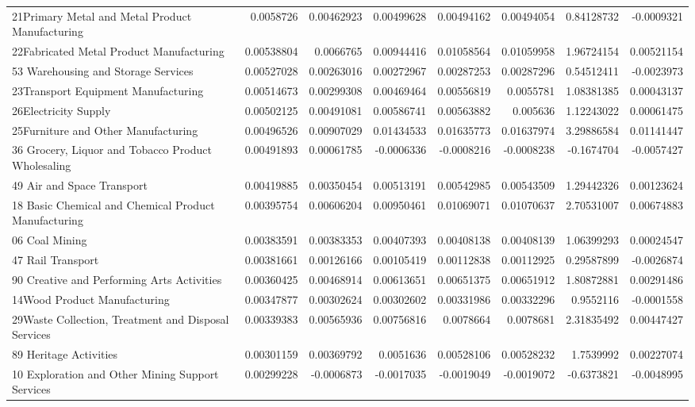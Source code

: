 \documentclass{monashthesis}
\begin{document}
\begin{table}[ht]
{\begin{tabular}{|l|r|rrrr|rr|}
    21Primary Metal and Metal Product Manufacturing & 0.0058726 & 0.00462923 & 0.00499628 & 0.00494162 & 0.00494054 & 0.84128732 & -0.0009321 \\
    22Fabricated Metal Product Manufacturing & 0.00538804 & 0.0066765 & 0.00944416 & 0.01058564 & 0.01059958 & 1.96724154 & 0.00521154 \\
    53 Warehousing and Storage Services & 0.00527028 & 0.00263016 & 0.00272967 & 0.00287253 & 0.00287296 & 0.54512411 & -0.0023973 \\
    23Transport Equipment Manufacturing & 0.00514673 & 0.00299308 & 0.00469464 & 0.00556819 & 0.0055781 & 1.08381385 & 0.00043137 \\
    26Electricity Supply & 0.00502125 & 0.00491081 & 0.00586741 & 0.00563882 & 0.005636 & 1.12243022 & 0.00061475 \\
    25Furniture and Other Manufacturing & 0.00496526 & 0.00907029 & 0.01434533 & 0.01635773 & 0.01637974 & 3.29886584 & 0.01141447 \\
    36 Grocery, Liquor and Tobacco Product Wholesaling & 0.00491893 & 0.00061785 & -0.0006336 & -0.0008216 & -0.0008238 & -0.1674704 & -0.0057427 \\
    49 Air and Space Transport & 0.00419885 & 0.00350454 & 0.00513191 & 0.00542985 & 0.00543509 & 1.29442326 & 0.00123624 \\
    18 Basic Chemical and Chemical Product Manufacturing & 0.00395754 & 0.00606204 & 0.00950461 & 0.01069071 & 0.01070637 & 2.70531007 & 0.00674883 \\
    06 Coal Mining & 0.00383591 & 0.00383353 & 0.00407393 & 0.00408138 & 0.00408139 & 1.06399293 & 0.00024547 \\
    47 Rail Transport & 0.00381661 & 0.00126166 & 0.00105419 & 0.00112838 & 0.00112925 & 0.29587899 & -0.0026874 \\
    90 Creative and Performing Arts Activities & 0.00360425 & 0.00468914 & 0.00613651 & 0.00651375 & 0.00651912 & 1.80872881 & 0.00291486 \\
    14Wood Product Manufacturing & 0.00347877 & 0.00302624 & 0.00302602 & 0.00331986 & 0.00332296 & 0.9552116 & -0.0001558 \\
    29Waste Collection, Treatment and Disposal Services & 0.00339383 & 0.00565936 & 0.00756816 & 0.0078664 & 0.0078681 & 2.31835492 & 0.00447427 \\
    89 Heritage Activities & 0.00301159 & 0.00369792 & 0.0051636 & 0.00528106 & 0.00528232 & 1.7539992 & 0.00227074 \\
    10 Exploration and Other Mining Support Services & 0.00299228 & -0.0006873 & -0.0017035 & -0.0019049 & -0.0019072 & -0.6373821 & -0.0048995 \\

\end{tabular}}
\end{table}
\end{document}
